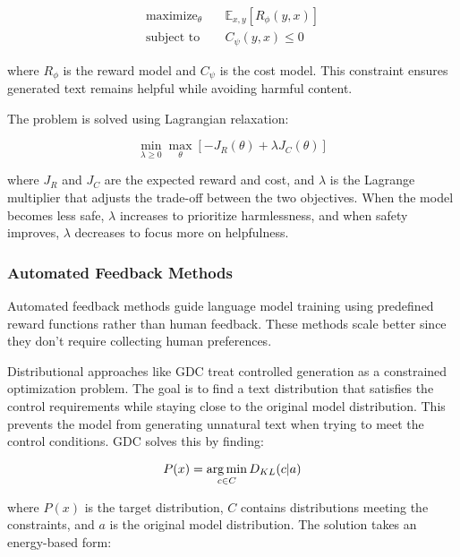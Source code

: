 \begin{equation}
\begin{aligned}
    \text{maximize}_\theta & \quad \mathbb{E}_{x,y}[R_\phi(y,x)] \\
    \text{subject to} & \quad C_\psi(y,x) \leq 0
\end{aligned}
\end{equation}

where $R_\phi$ is the reward model and $C_\psi$ is the cost model. This constraint ensures generated text remains helpful while avoiding harmful content.

The problem is solved using Lagrangian relaxation:

\begin{equation}
    \min_{\lambda \geq 0} \max_\theta [-J_R(\theta) + \lambda J_C(\theta)]
\end{equation}

where $J_R$ and $J_C$ are the expected reward and cost, and $\lambda$ is the Lagrange multiplier that adjusts the trade-off between the two objectives.
When the model becomes less safe, $\lambda$ increases to prioritize harmlessness, and when safety improves, $\lambda$ decreases to focus more on helpfulness.

\subsubsection{Automated Feedback Methods}

Automated feedback methods guide language model training using predefined reward functions rather than human feedback. 
These methods scale better since they don't require collecting human preferences. 

Distributional approaches like GDC \cite{khalifa2021distributionalapproachcontrolledtext} treat controlled generation as a constrained optimization problem. 
The goal is to find a text distribution that satisfies the control requirements while staying close to the original model distribution. This prevents the model from generating unnatural text when trying to meet the control conditions. 
GDC solves this by finding:

\begin{equation}
P(x) = \operatorname*{arg\,min}_{c \in C} D_{KL}(c | a)
\end{equation}

where $P(x)$ is the target distribution, $C$ contains distributions meeting the constraints, and $a$ is the original model distribution. The solution takes an energy-based form:

